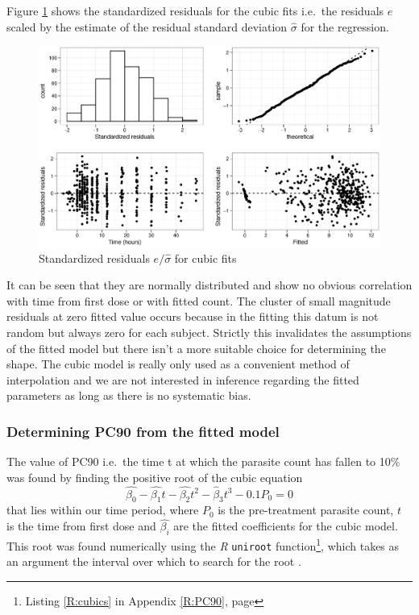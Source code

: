Figure \ref{cubicsresid} shows the standardized residuals for the cubic fits i.e.\ the residuals $e$ scaled by the estimate of the residual standard deviation $\hat{\sigma}$ for the regression.
\begin{figure}[h]
\includegraphics[width=150mm]{cubicsresid.eps} 
\caption{Standardized residuals $e/\hat{\sigma}$ for cubic fits}\label{cubicsresid}
\end{figure}
It can be seen that they are normally distributed and show no obvious correlation with time from first dose or with fitted count. The cluster of small magnitude residuals at zero fitted value occurs because in the fitting this datum is not random but always zero for each subject. Strictly this invalidates the assumptions of the fitted model but there isn't a more suitable choice for determining the shape. The cubic model is really only used as a convenient method of interpolation and we are not interested in inference regarding the fitted parameters as long as there is no systematic bias. 

\subsubsection*{Determining PC90 from the fitted model}
The value of PC90 i.e.\  the time t at which the parasite count has fallen to 10\% was found by finding the positive root of the cubic equation
$$\hat{\beta_0}-\hat{\beta_1}t-\hat{\beta_2}t^2-\hat{\beta}_3t^3-0.1{P_{0}}=0$$
that lies within our time period, where $P_0$ is the pre-treatment parasite count, $t$ is the time from first dose and $\hat{\beta_i}$ are the fitted coefficients for the cubic model. This root was found numerically using the \emph{R} \texttt{uniroot} function\footnote{Listing \ref{R:cubics} in Appendix \ref{R:PC90}, page \pageref{R:cubics}}, which takes as an argument the interval over which to search for the root \cite{R}.

